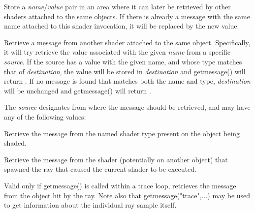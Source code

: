 \documentclass[11pt,letterpaper]{book}
\def\illuminance{{\cf illuminance}\xspace}
\begin{document}
Store a \emph{name}/\emph{value} pair in an area where it can later be
retrieved by other shaders attached to the same objects.  If there is
already a message with the same name attached to this shader invocation,
it will be replaced by the new value.
\apiend

Retrieve a message from another shader attached to the same object.
Specifically, it will try retrieve the value associated with the given
\emph{name} from a specific \emph{source}.  If the source has a value
with the given name, and whose type matches that of \emph{destination},
the value will be stored in \emph{destination} and {\cf getmessage()}
will return {}.  If no message is found that matches both the name
and type, \emph{destination} will be unchanged and {\cf getmessage()}
will return {}.

The \emph{source} designates from where the message should be retrieved,
and may have any of the following values:

\vspace{-8pt}

\vspace{10pt}
Retrieve the message from the named shader type present on the object
being shaded.
\apiend
\vspace{-20pt}

\vspace{10pt}
Retrieve the message from the shader (potentially on another object)
that spawned the ray that caused the current shader to be executed.
\apiend
\vspace{-20pt}

\vspace{10pt}
Valid only if {\cf getmessage()} is called within a {\cf trace} loop,
retrieves the message from the object hit by the ray.  Note also
that {\cf getmessage("trace",...)} may be used to get information
about the individual ray sample itself.
\apiend
\vspace{-20pt}
\end{document}
